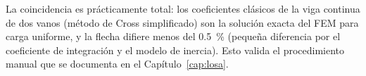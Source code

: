 La coincidencia es prácticamente total: los coeficientes clásicos de la
viga continua de dos vanos (método de Cross simplificado) son la
solución exacta del FEM para carga uniforme, y la flecha difiere menos
del \SI{0,5}{\percent} (pequeña diferencia por el coeficiente de
integración y el modelo de inercia). Esto valida el procedimiento
manual que se documenta en el Capítulo~\ref{cap:losa}.

